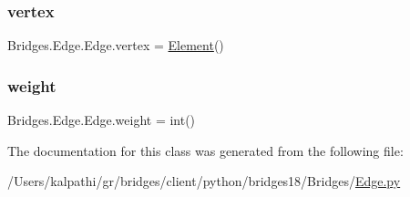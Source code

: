 \mbox{\label{class_bridges_1_1_edge_1_1_edge_aa503f86b141009ca9125093b4e903e38}} 
\subsubsection{\texorpdfstring{vertex}{vertex}}
{\footnotesize\ttfamily Bridges.\+Edge.\+Edge.\+vertex = \mbox{\hyperlink{class_bridges_1_1_element_1_1_element}{Element}}()\hspace{0.3cm}{\ttfamily [static]}}

\mbox{\label{class_bridges_1_1_edge_1_1_edge_a7219034dae365e8898fbf4bd901285b4}} 
\subsubsection{\texorpdfstring{weight}{weight}}
{\footnotesize\ttfamily Bridges.\+Edge.\+Edge.\+weight = int()\hspace{0.3cm}{\ttfamily [static]}}



The documentation for this class was generated from the following file\+:\begin{DoxyCompactItemize}
\item 
/\+Users/kalpathi/gr/bridges/client/python/bridges18/\+Bridges/\mbox{\hyperlink{_edge_8py}{Edge.\+py}}\end{DoxyCompactItemize}
